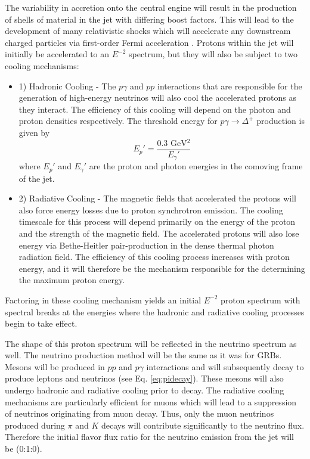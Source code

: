 \documentclass{gatech-thesis}
\begin{document}
The variability in accretion onto the central engine will result in the production of shells of material in the jet with differing boost factors. This will lead to the development of many relativistic shocks which will accelerate any downstream charged particles via first-order Fermi acceleration \cite{2005PhRvL..95f1103A}. Protons within the jet will initially be accelerated to an $E^{-2}$ spectrum, but they will also be subject to two cooling mechanisms:
\begin{itemize}
\item 1) Hadronic Cooling - The $p\gamma$ and $pp$ interactions that are responsible for the generation of high-energy neutrinos will also cool the accelerated protons as they interact. The efficiency of this cooling will depend on the photon and proton densities respectively. The threshold energy for $p\gamma \rightarrow \Delta^+$ production is given by
\begin{equation}
E_p' = \frac{0.3\text{ GeV$^2$}}{E_{\gamma}'}
\end{equation}
where $E_p'$ and $E_{\gamma}'$ are the proton and photon energies in the comoving frame of the jet.
\item 2) Radiative Cooling - The magnetic fields that accelerated the protons will also force energy losses due to proton synchrotron emission. The cooling timescale for this process will depend primarily on the energy of the proton and the strength of the magnetic field. The accelerated protons will also lose energy via Bethe-Heitler pair-production in the dense thermal photon radiation field. The efficiency of this cooling process increases with proton energy, and it will therefore be the mechanism responsible for the determining the maximum proton energy.
\end{itemize}
Factoring in these cooling mechanism yields an initial $E^{-2}$ proton spectrum with spectral breaks at the energies where the hadronic and radiative cooling processes begin to take effect.

The shape of this proton spectrum will be reflected in the neutrino spectrum as well. The neutrino production method will be the same as it was for GRBs. Mesons will be produced in $pp$ and $p\gamma$ interactions and will subsequently decay to produce leptons and neutrinos (see Eq. \ref{eq:pidecay}). These mesons will also undergo hadronic and radiative cooling prior to decay. The radiative cooling mechanisms are particularly efficient for muons which will lead to a suppression of neutrinos originating from muon decay. Thus, only the muon neutrinos produced during $\pi$ and $K$ decays will contribute significantly to the neutrino flux. Therefore the initial flavor flux ratio for the neutrino emission from the jet will be (0:1:0).
\end{document}
